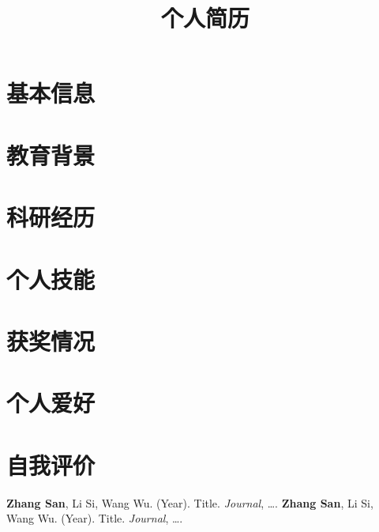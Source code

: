 \documentclass[11pt,a4paper]{moderncv}
\title{个人简历}
\begin{document}
\maketitle

\section{基本信息}

\section{教育背景}

\section{科研经历}

\section{个人技能}
\smallskip
{}

\section{获奖情况}

\section{个人爱好}

\section{自我评价}

\begin{thebibliography}{99}
\textbf{Zhang San}, Li Si, Wang Wu. (Year). Title. \textit{Journal}, \ldots.
\textbf{Zhang San}, Li Si, Wang Wu. (Year). Title. \textit{Journal}, \ldots.
\end{thebibliography}
\end{document}
